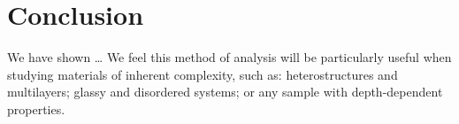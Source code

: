 \section{Conclusion \label{sec:conclusion}}
We have shown \dots
We feel this method of analysis will be particularly useful when studying materials of inherent complexity, such as:
heterostructures and multilayers;
glassy and disordered systems;
or any sample with depth-dependent properties.
